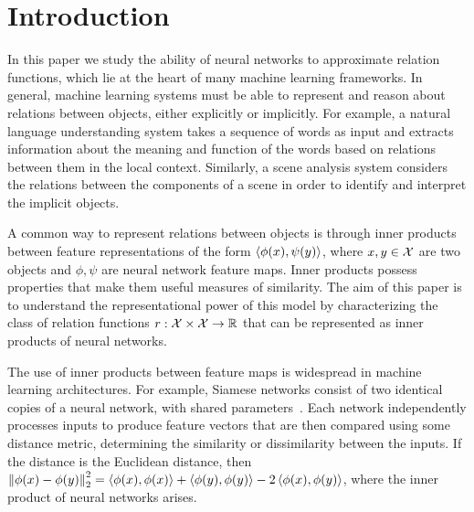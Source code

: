 \section{Introduction}\label{sec:intro}


In this paper we study the ability of neural networks to approximate relation functions, which lie at the heart of many machine learning frameworks. In general, machine learning systems must be able to represent and reason about relations between objects, either explicitly or implicitly. For example, a natural language understanding system takes a sequence of words as input and extracts information about the meaning and function of the words based on relations between them in the local context. Similarly, a scene analysis system considers the relations between the components of a scene in order to identify and interpret the implicit objects.

A common way to represent relations between objects is through inner products between feature representations of the form $\left \langle \phi(x), \psi(y) \right\rangle$, where $x, y \in {\mathcal{X}}$ are two objects and $\phi, \psi$ are neural network feature maps. Inner products possess properties that make them useful measures of similarity. The aim of this paper is to understand the representational power of this model by characterizing the class of relation functions $r: {\mathcal{X}} \times {\mathcal{X}} \to \mathbb{R}$ that can be represented as inner products of neural networks.

The use of inner products between feature maps is widespread in machine learning architectures. 
For example, Siamese networks consist of two identical copies of a neural network, with shared parameters~\parencite{rumelhartLearningRepresentationsBackpropagating1986,langTimedelayNeuralNetwork1988,bromleySignatureVerificationUsing1993,baldiNeuralNetworksFingerprint1993,chopraLearningSimilarityMetric2005,kochSiameseNeuralNetworks2015}. Each network independently processes inputs to produce feature vectors that are then compared using some distance metric, determining the similarity or dissimilarity between the inputs. If the distance is the Euclidean distance, then $\left\lVert\phi(x) - \phi(y)\right\rVert_{2}^2 = \left \langle \phi(x), \phi(x) \right\rangle + \left \langle \phi(y), \phi(y) \right\rangle - 2 \left \langle \phi(x), \phi(y) \right\rangle$, where the inner product of neural networks arises.

